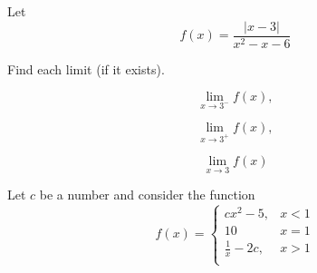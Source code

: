 \documentclass[11pt]{exam}
\begin{document}
\begin{questions}
\newpage
\addpoints

\addpoints
\question[15] 
Let 
\[
f(x)=\frac{|x-3|}{x^{2}-x-6}
\]

Find each limit (if it exists).

\begin{minipage}{.3\linewidth}
\begin{equation*}
 \lim_{x\to 3^{-}}f(x),
\end{equation*}
\end{minipage}%
\begin{minipage}{.3\linewidth}
\begin{equation*}
 \lim_{x\to 3^{+}}f(x),
\end{equation*}
\end{minipage}%
\begin{minipage}{.3\linewidth}
\begin{equation*}
 \lim_{x\to 3}f(x)
\end{equation*}
\end{minipage}

\vfill



\question[15] Let $c$ be a number and consider the function 
\[   f(x)=\left\{
\begin{array}{ll}
      cx^{2}-5,  & x < 1 \\
      10  & x=1 \\
      \frac{1}{x}-2c,  &  x > 1   \\ 
\end{array} 
\right. \]








\end{questions}
\end{document}
